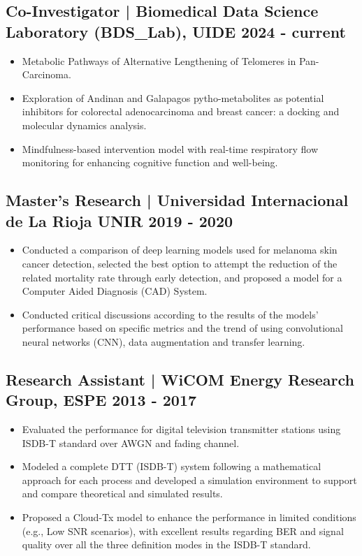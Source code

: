 \documentclass[11pt,a4paper]{article}
\begin{document}
\vspace{0.5em}
\subsection*{Co-Investigator | Biomedical Data Science Laboratory (BDS\_Lab), UIDE \hfill 2024 - current}
\begin{itemize}
    \item Metabolic Pathways of Alternative Lengthening of Telomeres in Pan-Carcinoma.
    \item Exploration of Andinan and Galapagos pytho-metabolites as potential inhibitors for colorectal adenocarcinoma and breast cancer: a docking and molecular dynamics analysis.
    \item Mindfulness-based intervention model with real-time respiratory flow monitoring for enhancing cognitive function and well-being.
\end{itemize}

\vspace{0.5em}
\subsection*{Master's Research | Universidad Internacional de La Rioja UNIR \hfill 2019 - 2020}
\begin{itemize}
    \item Conducted a comparison of deep learning models used for melanoma skin cancer detection, selected the best option to attempt the reduction of the related mortality rate through early detection, and proposed a model for a Computer Aided Diagnosis (CAD) System.
    \item Conducted critical discussions according to the results of the models' performance based on specific metrics and the trend of using convolutional neural networks (CNN), data augmentation and transfer learning.
\end{itemize}

\vspace{0.5em}
\subsection*{Research Assistant | WiCOM Energy Research Group, ESPE \hfill 2013 - 2017}
\begin{itemize}
    \item Evaluated the performance for digital television transmitter stations using ISDB-T standard over AWGN and fading channel.
    \item Modeled a complete DTT (ISDB-T) system following a mathematical approach for each process and developed a simulation environment to support and compare theoretical and simulated results.
    \item Proposed a Cloud-Tx model to enhance the performance in limited conditions (e.g., Low SNR scenarios), with excellent results regarding BER and signal quality over all the three definition modes in the ISDB-T standard.
\end{itemize}
\end{document}
